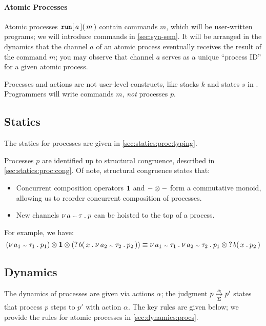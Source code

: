 \documentclass[11pt]{article}
\begin{document}
\paragraph{Atomic Processes}
Atomic processes ${{\mathtt{run}}\mathtt{[}\,{a}\,\mathtt{]}}\mathtt{(}\,m\,\mathtt{)}$ contain commands $m$, which will be user-written programs; we will introduce commands in \cref{sec:syn-sem}.
It will be arranged in the dynamics that the channel $a$ of an atomic process eventually receives the result of the command $m$; you may observe that channel $a$ serves as a unique ``process ID'' for a given atomic process.

\begin{remark}
  Processes and actions are not user-level constructs, like stacks $k$ and states $s$ in \LangKPCF{}.
  Programmers will write commands $m$, \emph{not} processes $p$.
\end{remark}

\subsection{Statics}

The statics for processes are given in \cref{sec:statics:proc:typing}.

Processes $p$ are identified up to structural congruence, described in \cref{sec:statics:proc:cong}.
Of note, structural congruence states that:
\begin{itemize}
  \item Concurrent composition operators $\textbf{1}$ and ${-}\mathbin{\otimes}{-}$ form a commutative monoid, allowing us to reorder concurrent composition of processes.
  \item New channels $\tnewproccst{\tau}{a}{p}$ can be hoisted to the top of a process.
\end{itemize}
For example, we have:
\[
  \jspeq
  {\concproccst{\concproccst{(\tnewproccst{\tau_1}{a_1}{p_1})}{\stopproccst}}{(\recvproccst{b}{x}{\tnewproccst{\tau_2}{a_2}{p_2}})}}
  {\tnewproccst{\tau_1}{a_1}{\tnewproccst{\tau_2}{a_2}{\concproccst{p_1}{\recvproccst{b}{x}{p_2}}}}}
\]

\subsection{Dynamics}\label{sec:procs:dynamics}

The dynamics of processes are given via actions $\alpha$; the judgment $p \underset{\Sigma}{\overset{\alpha}{\mapsto}} p'$ states that process $p$ steps to $p'$ with action $\alpha$.
The key rules are given below; we provide the rules for atomic processes in \cref{sec:dynamics:procs}.
\end{document}
